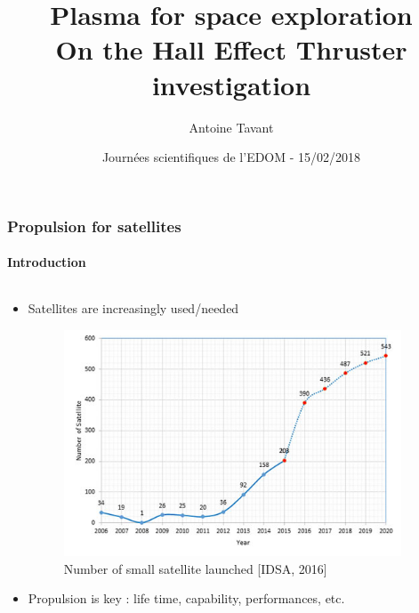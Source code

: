 \documentclass[sans, aspectratio=169]{beamer}
\title{\textbf{{\LARGE  Plasma for space exploration}}\\
On the Hall Effect Thruster investigation}
\date[JS-EDOM2018]{Journées scientifiques de l'EDOM - 15/02/2018}
\author[A. Tavant]{Antoine Tavant}
\begin{document}
\begin{frame}
\titlepage
\end{frame}

\begin{frame} 
	\frametitle{Propulsion for satellites} 
	\framesubtitle{Introduction} 
	\vspace{-1.07cm}
	\begin{columns}
		\begin{column}{0.75\linewidth}
		
			\begin{itemize} 
				\item Satellites are increasingly used/needed
				
				\begin{figure}[hbtp]
				\centering
				\includegraphics[scale=0.3]{images/sattelite-number.jpg}
				\caption{Number of small satellite launched [IDSA, 2016]}
			\end{figure}
			
				\item Propulsion is key : life time, capability, performances, etc. 

			\end{itemize}
					
		\end{column}
		
		\begin{column}{0.3\linewidth}
		

\end{column}
\end{columns}
\end{frame}
\end{document}
